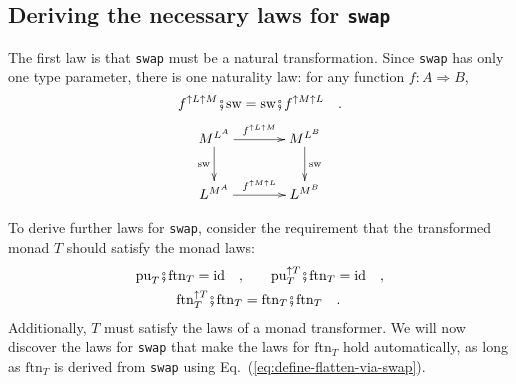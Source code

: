 \subsection{Deriving the necessary laws for \texttt{swap}}

The first law is that \texttt{}\lstinline!swap!
must be a natural transformation. Since \texttt{}\lstinline!swap!
has only one type parameter, there is one naturality law: for any
function $f:A\Rightarrow B$, 
\begin{equation}
f^{\uparrow L\uparrow M}\bef\text{sw}=\text{sw}\bef f^{\uparrow M\uparrow L}\quad.\label{eq:swap-law-0-naturality}
\end{equation}
\[
\xymatrix{\xyScaleY{2pc}\xyScaleX{3pc}M^{L^{A}}\ar[r]\sp(0.5){f^{\uparrow L\uparrow M}}\ar[d]\sb(0.45){\text{sw}} & M^{L^{B}}\ar[d]\sp(0.45){\text{sw}}\\
L^{M^{A}}\ar[r]\sp(0.5){f^{\uparrow M\uparrow L}} & L^{M^{B}}
}
\]

To derive further laws for \lstinline!swap!,
consider the requirement that the transformed monad $T$ should satisfy
the monad laws:
\begin{align*}
\text{pu}_{T}\bef\text{ftn}_{T}=\text{id}\quad, & \quad\quad\text{pu}_{T}^{\uparrow T}\bef\text{ftn}_{T}=\text{id}\quad,\\
\text{ftn}_{T}^{\uparrow T}\bef\text{ftn}_{T} & =\text{ftn}_{T}\bef\text{ftn}_{T}\quad.
\end{align*}
Additionally, $T$ must satisfy the laws of a monad transformer. We
will now discover the laws for \texttt{swap} that make the laws for
$\text{ftn}_{T}$ hold automatically, as long as $\text{ftn}_{T}$
is derived from \texttt{}\lstinline!swap!
using Eq.~(\ref{eq:define-flatten-via-swap}).

